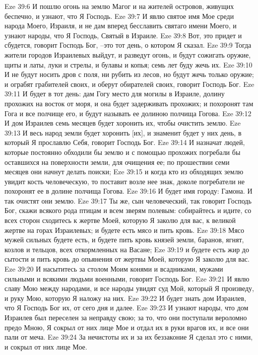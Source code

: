 Eze 39:6  И пошлю огонь на землю Магог и на жителей островов, живущих беспечно, и узнают, что Я Господь.
Eze 39:7  И явлю святое имя Мое среди народа Моего, Израиля, и не дам вперед бесславить святаго имени Моего, и узнают народы, что Я Господь, Святый в Израиле.
Eze 39:8  Вот, это придет и сбудется, говорит Господь Бог, --это тот день, о котором Я сказал.
Eze 39:9  Тогда жители городов Израилевых выйдут, и разведут огонь, и будут сожигать оружие, щиты и латы, луки и стрелы, и булавы и копья; семь лет буду жечь их.
Eze 39:10  И не будут носить дров с поля, ни рубить из лесов, но будут жечь только оружие; и ограбят грабителей своих, и оберут обирателей своих, говорит Господь Бог.
Eze 39:11  И будет в тот день: дам Гогу место для могилы в Израиле, долину прохожих на восток от моря, и она будет задерживать прохожих; и похоронят там Гога и все полчище его, и будут называть ее долиною полчища Гогова.
Eze 39:12  И дом Израилев семь месяцев будет хоронить их, чтобы очистить землю.
Eze 39:13  И весь народ земли будет хоронить [их], и знаменит будет у них день, в который Я прославлю Себя, говорит Господь Бог.
Eze 39:14  И назначат людей, которые постоянно обходили бы землю и с помощью прохожих погребали бы оставшихся на поверхности земли, для очищения ее; по прошествии семи месяцев они начнут делать поиски;
Eze 39:15  и когда кто из обходящих землю увидит кость человеческую, то поставит возле нее знак, доколе погребатели не похоронят ее в долине полчища Гогова.
Eze 39:16  И будет имя городу: Гамона. И так очистят они землю.
Eze 39:17  Ты же, сын человеческий, так говорит Господь Бог, скажи всякого рода птицам и всем зверям полевым: собирайтесь и идите, со всех сторон сходитесь к жертве Моей, которую Я заколю для вас, к великой жертве на горах Израилевых; и будете есть мясо и пить кровь.
Eze 39:18  Мясо мужей сильных будете есть, и будете пить кровь князей земли, баранов, ягнят, козлов и тельцов, всех откормленных на Васане;
Eze 39:19  и будете есть жир до сытости и пить кровь до опьянения от жертвы Моей, которую Я заколю для вас.
Eze 39:20  И насытитесь за столом Моим конями и всадниками, мужами сильными и всякими людьми военными, говорит Господь Бог.
Eze 39:21  И явлю славу Мою между народами, и все народы увидят суд Мой, который Я произведу, и руку Мою, которую Я наложу на них.
Eze 39:22  И будет знать дом Израилев, что Я Господь Бог их, от сего дня и далее.
Eze 39:23  И узнают народы, что дом Израилев был переселен за неправду свою; за то, что они поступали вероломно предо Мною, Я сокрыл от них лице Мое и отдал их в руки врагов их, и все они пали от меча.
Eze 39:24  За нечистоты их и за их беззаконие Я сделал это с ними, и сокрыл от них лице Мое.
